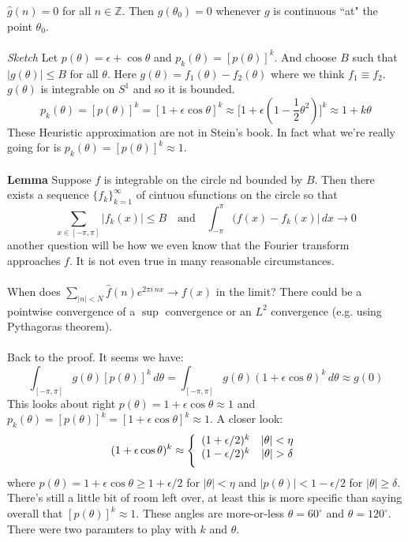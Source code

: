 \documentclass[12pt]{article}
\begin{document}
$\hat{g}(n) = 0$ for all $n \in \mathbb{Z}$. 
Then $g(\theta_0) = 0$ whenever $g$ is continuous
``at" the point $\theta_0$. \\ \\
\textit{Sketch} Let $p(\theta) = \epsilon + \cos \theta$ and $p_k(\theta) = [p(\theta)]^k$. And choose $B$ such that $|g(\theta)| \leq B$ for all $\theta$. Here $g(\theta) = f_1(\theta) - f_2(\theta)$ where we think $f_1 \equiv f_2$.  $g(\theta)$ is integrable on $S^1$ and so it is bounded.  
$$ p_k(\theta) = [p(\theta)]^k = [1 + \epsilon \cos \theta]^k \approx \big[1 + \epsilon(1 - \frac{1}{2}\theta^2)\big]^k  \approx 1 + k \theta $$
These Heuristic approximation are not in Stein's book.  In fact what we're really going for is $p_k(\theta) = [p(\theta)]^k \approx 1$.  \\ \\
\textbf{Lemma} Suppose $f$ is integrable on the circle nd bounded by $B$.  Then there exists a sequence $\{ f_k\}_{k=1}^\infty$ of cintuou sfunctions on the circle so that 
$$ \sum_{x \in [-\pi , \pi ]} |f_k(x) | \leq B
\quad\text{and}\quad \int_{-\pi}^\pi (f(x) - f_k(x)| \, dx \to 0 $$
another question will be how we even know that the Fourier transform approaches $f$.  It is not even true in many reasonable circumstances.  \\ \\
When does $\displaystyle \sum_{|n| < N} \hat{f}(n) e^{2\pi i \, n x} \to f(x)$ in the limit?  There could be a pointwise convergence of a $\sup$ convergence or an $L^2$ convergence (e.g. using Pythagoras theorem). \\ \\
Back to the proof.  It seems we have:  
$$ \int_{[-\pi,\pi]} g(\theta) [p(\theta)]^k \, d\theta
= \int_{[-\pi,\pi]} g(\theta) (1 + \epsilon \cos \theta)^k \, d\theta \approx g(0) $$
This looks about right $p(\theta) = 1 + \epsilon \cos \theta \approx 1$ and $p_k(\theta) = [p(\theta)]^k = [1 + \epsilon \cos \theta]^k \approx 1$. A closer look:
$$ (1 + \epsilon \cos \theta)^k \approx \left\{
\begin{array}{cc} 
(1 + \epsilon/2)^k & |\theta| < \eta \\ \vspace{6pt}
(1 - \epsilon/2)^k & |\theta| > \delta \end{array} \right. $$
where $p(\theta) = 1 + \epsilon \cos \theta \geq 1 + \epsilon/2$ for $|\theta| < \eta$ and $|p(\theta)| < 1 - \epsilon/2$ for $|\theta| \geq \delta$.  There's still a little bit of room left over, at least this is more specific than saying overall that $[p(\theta)]^k \approx 1$.  These angles are more-or-less $\theta = 60^\circ$ and $\theta = 120^\circ$.   There were two paramters to play with $k$ and $\theta$. \\ \\
\end{document}
